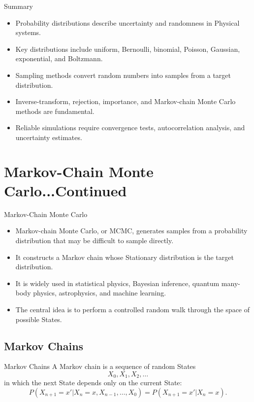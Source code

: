 \documentclass[a4paper, 10pt, onepage]{elegantbook}
\begin{document}
{\begin{frame}{Summary}
  \begin{itemize}
    \item Probability distributions describe uncertainty and randomness in Physical systems.
    \item Key distributions include uniform, Bernoulli, binomial, Poisson, Gaussian, exponential, and Boltzmann.
    \item Sampling methods convert random numbers into samples from a target distribution.
    \item Inverse-transform, rejection, importance, and Markov-chain Monte Carlo 
methods are fundamental.
    \item Reliable simulations require convergence tests, autocorrelation analysis, and uncertainty estimates.
  \end{itemize}
\end{frame}

\newpage

\section{Markov-Chain Monte Carlo...Continued}

\begin{frame}{Markov-Chain Monte Carlo}
  \begin{itemize}
    \item Markov-chain Monte Carlo, or MCMC, generates samples from a probability distribution that may be difficult to 
sample directly.
    \item It constructs a Markov chain whose Stationary distribution is the target distribution.
    \item It is widely used in statistical physics, Bayesian inference, quantum many-body physics, astrophysics, and 
machine learning.
    \item The central idea is to perform a controlled random walk through the space of possible States.
  \end{itemize}
\end{frame}

\subsection{Markov Chains}

\begin{frame}{Markov Chains}
  A Markov chain is a sequence of random States
  \[
    X_0,X_1,X_2,\ldots
  \]
  in which the next State depends only on the current State:
  \[
    P(X_{n+1}=x'|X_n=x,X_{n-1},\ldots,X_0)
    =
    P(X_{n+1}=x'|X_n=x).
  \]


\end{frame}}
\end{document}
